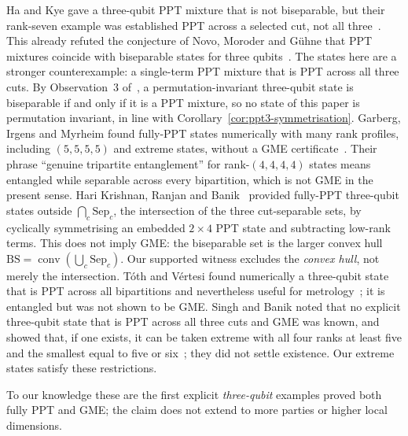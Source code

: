Ha and Kye gave a three-qubit PPT mixture that is not biseparable, but their rank-seven example was established
PPT across a selected cut, not all three~\cite{HK}. This already refuted the conjecture of Novo, Moroder and G\"uhne that
PPT mixtures coincide with biseparable states for three qubits~\cite{NMG}. The states here are a stronger counterexample: a
single-term PPT mixture that is PPT across all three cuts. By Observation~3 of~\cite{NMG}, a permutation-invariant
three-qubit state is biseparable if and only if it is a PPT mixture, so no state of this paper is permutation invariant, in
line with Corollary~\ref{cor:ppt3-symmetrisation}.
Garberg, Irgens and Myrheim found fully-PPT states
numerically with many rank profiles, including $(5,5,5,5)$ and extreme states, without a GME
certificate~\cite{GIM}. Their phrase ``genuine tripartite entanglement'' for rank-$(4,4,4,4)$ states means entangled while
separable across every bipartition, which is not GME in the present sense.
Hari Krishnan, Ranjan and Banik~\cite{KRB} provided
fully-PPT three-qubit states outside
$\bigcap_c\mathrm{Sep}_c$, the intersection of the
three cut-separable sets, by cyclically symmetrising an embedded $2\times4$ PPT state and subtracting low-rank terms.
This does not imply GME:
the biseparable set is the larger convex hull
$\mathrm{BS}=\operatorname{conv}(\bigcup_c\mathrm{Sep}_c)$.
Our supported witness excludes the \emph{convex hull},
not merely the intersection. T\'oth and V\'ertesi found numerically a three-qubit state that is PPT across all
bipartitions and nevertheless useful for metrology~\cite{TV}; it is entangled but was not shown to be GME.
Singh and Banik noted that no explicit three-qubit state that is PPT across all three cuts and GME was known,
and showed that, if one exists, it can be taken extreme with all four ranks at least five and the smallest equal to five
or six~\cite{SB}; they did not settle existence. Our extreme states satisfy these restrictions.

To our knowledge these are the first explicit
\emph{three-qubit} examples proved both fully PPT and GME;
the claim does not extend to more parties
or higher local dimensions.

